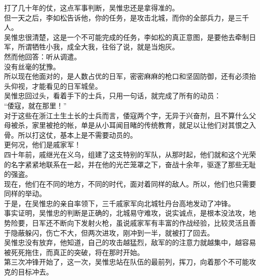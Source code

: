 \begin{multicols}{\theparacolNo}
打了几十年的仗，这点军事判断，吴惟忠还是拿得准的。\\

但一天之后，李如松告诉他，你的任务，是攻击北城，而你的全部兵力，是三千人。\\

吴惟忠很清楚，这是一个不可能完成的任务，李如松的真正意图，是要他去牵制日军，所谓牺牲小我，成全大我，往俗了说，就是当炮灰。\\

然而他回答：听从调遣。\\

没有丝毫的犹豫。\\

所以现在他面对的，是人数占优的日军，密密麻麻的枪口和坚固防御，还有必须抬头仰视，才能看见的日军城垒。\\

吴惟忠回过头，看着手下的士兵，只用一句话，就完成了所有的动员：\\

“倭寇，就在那里！”\\

对于这些在浙江土生土长的士兵而言，倭寇两个字，无异于兴奋剂，且不算什么父母被杀，家里被抢的帐，单是从小耳闻目睹的传统教育，就足以让他们对其恨之入骨。所以打这仗，基本上是不需要动员的。\\

更何况，他们是戚家军！\\

四十年前，戚继光在义乌，组建了这支特别的军队，从那时起，他们就和这个光荣的名字紧紧地联系在一起，并在他的光芒笼罩之下，奋战十余年，驱逐了那些无耻的强盗。\\

现在，他们在不同的地方，不同的时代，面对着同样的敌人。所以，他们也只需要同样的举动。\\

于是，在吴惟忠的亲自率领下，三千戚家军向北城牡丹台高地发动了冲锋。\\

事实证明，吴惟忠的判断是正确的，北城易守难攻，说实诚点，是根本没法攻，地势险要，日军还不断向下发射火枪，虽说戚家军有丰富的作战经验，比较灵活且善于隐蔽躲闪，伤亡不大，但两次进攻，刚冲到一半，就被打了回去。\\

吴惟忠没有放弃，他知道，自己的攻击越猛烈，敌军的的注意力就越集中，越容易被死死拖住，而真正的突破，将在那时开始。\\

第三次冲锋开始了，这一次，吴惟忠站在队伍的最前列，挥刀，向着那个不可能攻克的目标冲去。\\


\end{multicols}
